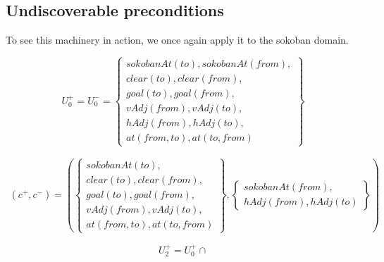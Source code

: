 \documentclass[../master.tex]{subfiles}
\begin{document}
\subsection{Undiscoverable preconditions}

To see this machinery in action, we once again apply it to the sokoban domain.

\[
U_0^+ = U_0^- =
\left\{
    \begin{gathered}
        sokobanAt(to), sokobanAt(from), \\
        clear(to), clear(from), \\
        goal(to), goal(from), \\
        vAdj(from), vAdj(to), \\
        hAdj(from), hAdj(to), \\
        at(from, to), at(to, from)
    \end{gathered}
\right\}
\]

%

\begin{align}
(c^+, c^-) =
\left(
    \left\{
        \begin{gathered}
            sokobanAt(to), \\
            clear(to), clear(from), \\
            goal(to), goal(from), \\
            vAdj(from), vAdj(to), \\
            at(from, to), at(to, from)
        \end{gathered}
    \right\}
    ,
    \left\{
        \begin{gathered}
            sokobanAt(from), \\
            hAdj(from), hAdj(to)
        \end{gathered}
    \right\}
\right)
\end{align}


\[
    U_2^+ = U_0^+ \cap
\]
\end{document}
